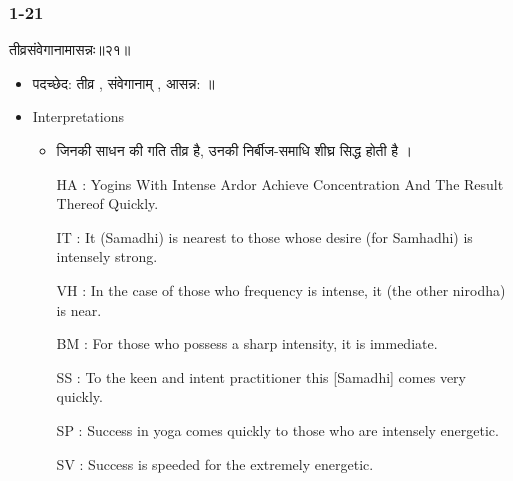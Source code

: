 \begin{frame}[fragile]\frametitle{1-21}
\begin{sanskrit}
तीव्रसंवेगानामासन्नः॥२१॥
\end{sanskrit}

	\begin{itemize}
	\item पदच्छेद: तीव्र , संवेगानाम् , आसन्न: ॥
	\item Interpretations
		\begin{itemize}		
		\item जिनकी साधन की गति तीव्र है, उनकी निर्बीज-समाधि शीघ्र सिद्ध होती है ।
		\item [HA]: Yogins With Intense Ardor Achieve Concentration And The Result Thereof Quickly.
		\item [IT]: It (Samadhi) is nearest to those whose desire (for Samhadhi) is intensely strong.
		\item [VH]: In the case of those who frequency is intense, it (the other nirodha) is near.
		\item [BM]: For those who possess a sharp intensity, it is immediate.
		\item [SS]: To the keen and intent practitioner this [Samadhi] comes very quickly.
		\item [SP]: Success in yoga comes quickly to those who are intensely energetic.
		\item [SV]: Success is speeded for the extremely energetic.
		\end{itemize}
	\end{itemize}
	
\end{frame}


